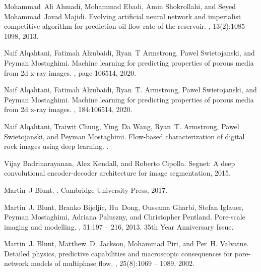 \documentclass{article}
\begin{document}
%   
% 
\begin{thebibliography}{10}

Mohammad~Ali Ahmadi, Mohammad Ebadi, Amin Shokrollahi, and Seyed Mohammad~Javad
  Majidi.
\newblock Evolving artificial neural network and imperialist competitive
  algorithm for prediction oil flow rate of the reservoir.
, 13(2):1085 -- 1098, 2013.

Naif Alqahtani, Fatimah Alzubaidi, Ryan~T Armstrong, Pawel Swietojanski, and
  Peyman Mostaghimi.
\newblock Machine learning for predicting properties of porous media from 2d
  x-ray images.
, page 106514,
  2020.

Naif Alqahtani, Fatimah Alzubaidi, Ryan~T. Armstrong, Pawel Swietojanski, and
  Peyman Mostaghimi.
\newblock Machine learning for predicting properties of porous media from 2d
  x-ray images.
, 184:106514, 2020.

Naif Alqahtani, Traiwit Chung, Ying~Da Wang, Ryan~T. Armstrong, Pawel
  Swietojanski, and Peyman Mostaghimi.
\newblock Flow-based characterization of digital rock images using deep
  learning.
.

Vijay Badrinarayanan, Alex Kendall, and Roberto Cipolla.
\newblock Segnet: A deep convolutional encoder-decoder architecture for image
  segmentation, 2015.

Martin~J Blunt.
.
\newblock Cambridge University Press, 2017.

Martin~J. Blunt, Branko Bijeljic, Hu~Dong, Oussama Gharbi, Stefan Iglauer,
  Peyman Mostaghimi, Adriana Paluszny, and Christopher Pentland.
\newblock Pore-scale imaging and modelling.
, 51:197 -- 216, 2013.
\newblock 35th Year Anniversary Issue.

Martin~J. Blunt, Matthew~D. Jackson, Mohammad Piri, and Per~H. Valvatne.
\newblock Detailed physics, predictive capabilities and macroscopic
  consequences for pore-network models of multiphase flow.
, 25(8):1069 -- 1089, 2002.


\end{thebibliography}
\end{document}
